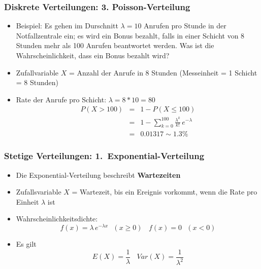 \begin{frame}
    \frametitle{Diskrete Verteilungen: 3. Poisson-Verteilung}

\begin{itemize}
\item Beispiel: Es gehen im Durschnitt $\lambda=10$ Anrufen pro Stunde in der Notfallzentrale ein; es wird ein Bonus bezahlt, falls in einer Schicht von 8 Stunden mehr als 100 Anrufen beantwortet werden. Was ist die Wahrscheinlichkeit, dass ein Bonus bezahlt wird?
\item Zufallvariable $X$ = Anzahl der Anrufe in 8 Stunden (Messeinheit = 1 Schicht = 8 Stunden)
\item Rate der Anrufe pro Schicht: $\lambda = 8*10 = 80$
\begin{eqnarray*}
P(X > 100) &=& 1- P(X \le 100) \\
&=& 1- \sum_{k=0}^{100} \frac{\lambda^k}{k!}\,e^{-\lambda} \\
&=& 0.01317 \sim 1.3 \%
\end{eqnarray*}
\end{itemize}
\end{frame}

\begin{frame}
    \frametitle{Stetige Verteilungen: 1.\ Exponential-Verteilung}

    \begin{itemize}
        \item Die Exponential-Verteilung beschreibt {\bf Wartezeiten}
        \item Zufallsvariable $X$ = Wartezeit, bis ein Ereignis vorkommt, wenn die Rate pro Einheit $\lambda$ ist
        \item Wahrscheinlichkeitsdichte:
        $$
f(x) = \lambda\,e^{-\lambda x} ~~~(x \ge 0)~~~~f(x) = 0 ~~~(x<0)
        $$
        \item Es gilt
        $$
        E(X) = \frac{1}{\lambda}~~~~Var(X) = \frac{1}{\lambda^2}
        $$
    \end{itemize}
    

\end{frame}

